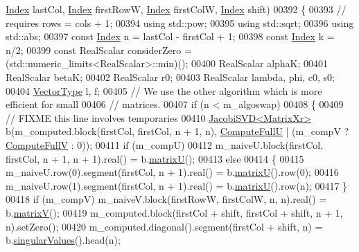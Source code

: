 \begin{DoxyCode}
      \hyperlink{namespace_eigen_a62e77e0933482dafde8fe197d9a2cfde}{Index} lastCol, \hyperlink{namespace_eigen_a62e77e0933482dafde8fe197d9a2cfde}{Index} firstRowW, \hyperlink{namespace_eigen_a62e77e0933482dafde8fe197d9a2cfde}{Index} firstColW, \hyperlink{namespace_eigen_a62e77e0933482dafde8fe197d9a2cfde}{Index} shift)
00392 \{
00393   \textcolor{comment}{// requires rows = cols + 1;}
00394   \textcolor{keyword}{using} std::pow;
00395   \textcolor{keyword}{using} std::sqrt;
00396   \textcolor{keyword}{using} std::abs;
00397   \textcolor{keyword}{const} \hyperlink{namespace_eigen_a62e77e0933482dafde8fe197d9a2cfde}{Index} n = lastCol - firstCol + 1;
00398   \textcolor{keyword}{const} \hyperlink{namespace_eigen_a62e77e0933482dafde8fe197d9a2cfde}{Index} k = n/2;
00399   \textcolor{keyword}{const} RealScalar considerZero = (std::numeric\_limits<RealScalar>::min)();
00400   RealScalar alphaK;
00401   RealScalar betaK; 
00402   RealScalar r0; 
00403   RealScalar lambda, phi, c0, s0;
00404   \hyperlink{group___core___module}{VectorType} l, f;
00405   \textcolor{comment}{// We use the other algorithm which is more efficient for small }
00406   \textcolor{comment}{// matrices.}
00407   \textcolor{keywordflow}{if} (n < m\_algoswap)
00408   \{
00409     \textcolor{comment}{// FIXME this line involves temporaries}
00410     \hyperlink{group___s_v_d___module_class_eigen_1_1_jacobi_s_v_d}{JacobiSVD<MatrixXr>} b(m\_computed.block(firstCol, firstCol, n + 1, n), 
      \hyperlink{group__enums_ggae3e239fb70022eb8747994cf5d68b4a9a2b4f91ca5859a4159dbfe8090043817f}{ComputeFullU} | (m\_compV ? \hyperlink{group__enums_ggae3e239fb70022eb8747994cf5d68b4a9a52c6f7e80bbf9a42297c88f700245b51}{ComputeFullV} : 0));
00411     \textcolor{keywordflow}{if} (m\_compU)
00412       m\_naiveU.block(firstCol, firstCol, n + 1, n + 1).real() = b.\hyperlink{group___s_v_d___module_afc7fe1546b0f6e1801b86f22f5664cb8}{matrixU}();
00413     \textcolor{keywordflow}{else} 
00414     \{
00415       m\_naiveU.row(0).segment(firstCol, n + 1).real() = b.\hyperlink{group___s_v_d___module_afc7fe1546b0f6e1801b86f22f5664cb8}{matrixU}().row(0);
00416       m\_naiveU.row(1).segment(firstCol, n + 1).real() = b.\hyperlink{group___s_v_d___module_afc7fe1546b0f6e1801b86f22f5664cb8}{matrixU}().row(n);
00417     \}
00418     \textcolor{keywordflow}{if} (m\_compV) m\_naiveV.block(firstRowW, firstColW, n, n).real() = b.\hyperlink{group___s_v_d___module_a245a453b5e7347f737295c23133238c4}{matrixV}();
00419     m\_computed.block(firstCol + shift, firstCol + shift, n + 1, n).setZero();
00420     m\_computed.diagonal().segment(firstCol + shift, n) = b.\hyperlink{group___s_v_d___module_a4e7bac123570c348f7ed6be909e1e474}{singularValues}().head(n);

\end{DoxyCode}

